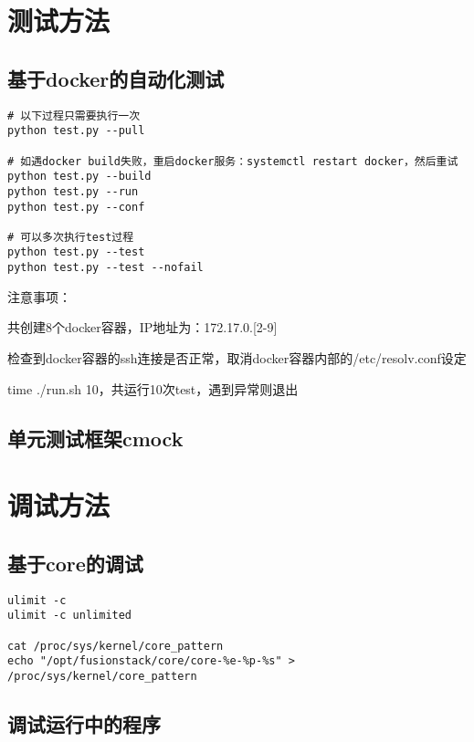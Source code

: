 \section{测试方法}

\subsection{基于docker的自动化测试}

\begin{lstlisting}
# 以下过程只需要执行一次
python test.py --pull

# 如遇docker build失败，重启docker服务：systemctl restart docker，然后重试
python test.py --build
python test.py --run
python test.py --conf

# 可以多次执行test过程
python test.py --test
python test.py --test --nofail
\end{lstlisting}

注意事项：
\begin{compactenum}
\item 共创建8个docker容器，IP地址为：172.17.0.[2-9]
\item 检查到docker容器的ssh连接是否正常，取消docker容器内部的/etc/resolv.conf设定
\item time ./run.sh 10，共运行10次test，遇到异常则退出
\end{compactenum}

\subsection{单元测试框架cmock}

\section{调试方法}

\subsection{基于core的调试}

\begin{lstlisting}
ulimit -c
ulimit -c unlimited

cat /proc/sys/kernel/core_pattern
echo "/opt/fusionstack/core/core-%e-%p-%s" > /proc/sys/kernel/core_pattern
\end{lstlisting}

\subsection{调试运行中的程序}

